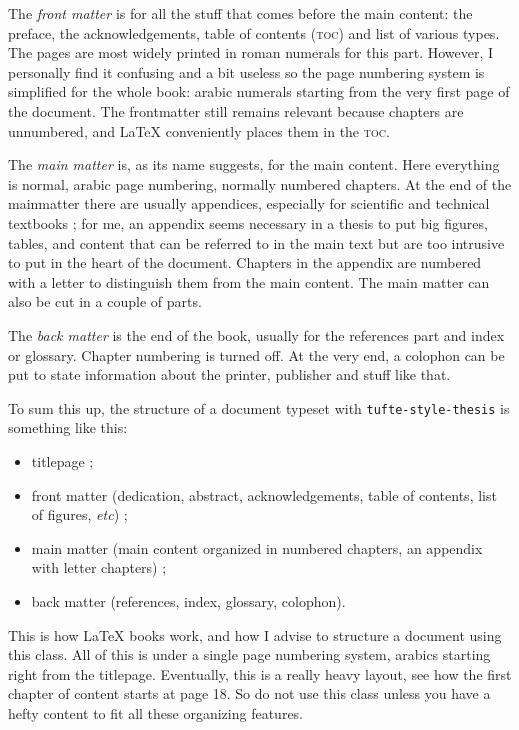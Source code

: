 \documentclass[
    11pt,
]{tufte-style-thesis}
\begin{document}
The \textit{front matter} is for all the stuff that comes before the main content: the preface, the acknowledgements, table of contents (\textsc{toc}) and list of various types. The pages are most widely printed in roman numerals for this part. However, I personally find it confusing and a bit useless so the page numbering system is simplified for the whole book: arabic numerals starting from the very first page of the document. The frontmatter still remains relevant because chapters are unnumbered, and \LaTeX{} conveniently places them in the \textsc{toc}.

The \textit{main matter} is, as its name suggests, for the main content. Here everything is normal, arabic page numbering, normally numbered chapters. At the end of the mainmatter there are usually appendices, especially for scientific and technical textbooks ; for me, an appendix seems necessary in a thesis to put big figures, tables, and content that can be referred to in the main text but are too intrusive to put in the heart of the document. Chapters in the appendix are numbered with a letter to distinguish them from the main content. The main matter can also be cut in a couple of parts.

The \textit{back matter} is the end of the book, usually for the references part and index or glossary. Chapter numbering is turned off. At the very end, a colophon can be put to state information about the printer, publisher and stuff like that.

To sum this up, the structure of a document typeset with \texttt{tufte-style-thesis} is something like this:
\begin{itemize}
  \item titlepage ;
  \item front matter (dedication, abstract, acknowledgements, table of contents, list of figures, \textit{etc}) ;
  \item main matter (main content organized in numbered chapters, an appendix with letter chapters) ;
  \item back matter (references, index, glossary, colophon).
\end{itemize}
This is how \LaTeX{} books work, and how I advise to structure a document using this class. All of this is under a single page numbering system, arabics starting right from the titlepage. Eventually, this is a really heavy layout, see how the first chapter of content starts at page 18. So do not use this class unless you have a hefty content to fit all these organizing features.
\end{document}
